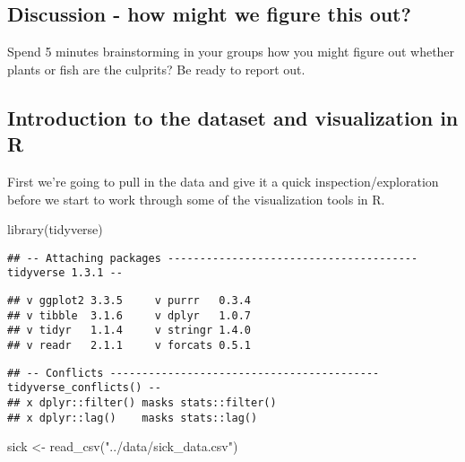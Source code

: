 \documentclass[
]{article}
\newenvironment{Shaded}{\begin{snugshade}}{\end{snugshade}}
\newcommand{\FunctionTok}[1]{\textcolor[rgb]{0.00,0.00,0.00}{#1}}
\newcommand{\NormalTok}[1]{#1}
\newcommand{\OtherTok}[1]{\textcolor[rgb]{0.56,0.35,0.01}{#1}}
\newcommand{\StringTok}[1]{\textcolor[rgb]{0.31,0.60,0.02}{#1}}
\begin{document}
\hypertarget{discussion---how-might-we-figure-this-out}{%
\subsection{Discussion - how might we figure this
out?}\label{discussion---how-might-we-figure-this-out}}

Spend 5 minutes brainstorming in your groups how you might figure out
whether plants or fish are the culprits? Be ready to report out.

\hypertarget{introduction-to-the-dataset-and-visualization-in-r}{%
\subsection{Introduction to the dataset and visualization in
R}\label{introduction-to-the-dataset-and-visualization-in-r}}

First we're going to pull in the data and give it a quick
inspection/exploration before we start to work through some of the
visualization tools in R.

\begin{Shaded}
\begin{Highlighting}[]
\FunctionTok{library}\NormalTok{(tidyverse)}
\end{Highlighting}
\end{Shaded}

\begin{verbatim}
## -- Attaching packages --------------------------------------- tidyverse 1.3.1 --
\end{verbatim}

\begin{verbatim}
## v ggplot2 3.3.5     v purrr   0.3.4
## v tibble  3.1.6     v dplyr   1.0.7
## v tidyr   1.1.4     v stringr 1.4.0
## v readr   2.1.1     v forcats 0.5.1
\end{verbatim}

\begin{verbatim}
## -- Conflicts ------------------------------------------ tidyverse_conflicts() --
## x dplyr::filter() masks stats::filter()
## x dplyr::lag()    masks stats::lag()
\end{verbatim}

\begin{Shaded}
\begin{Highlighting}[]
\NormalTok{sick }\OtherTok{\textless{}{-}} \FunctionTok{read\_csv}\NormalTok{(}\StringTok{"../data/sick\_data.csv"}\NormalTok{)}
\end{Highlighting}
\end{Shaded}
\end{document}
